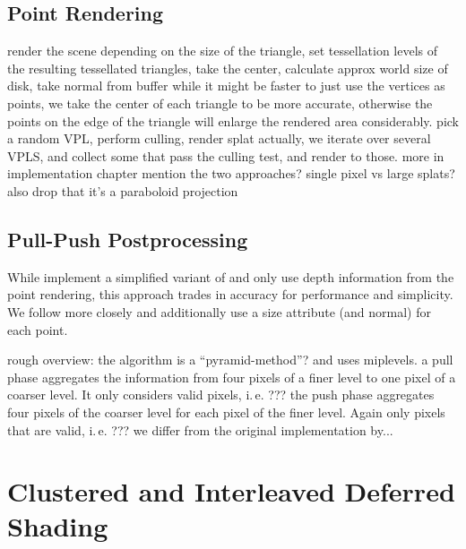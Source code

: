 \subsection{Point Rendering}
\begin{outline}
\1 render the scene
\1 depending on the size of the triangle, set tessellation levels
\1 of the resulting tessellated triangles, take the center, calculate approx world size of disk, take normal from buffer
\1 while it might be faster to just use the vertices as points, we take the center of each triangle to be more accurate, otherwise the points on the edge of the triangle will enlarge the rendered area considerably.
\1 pick a random VPL, perform culling, render splat
\1 actually, we iterate over several VPLS, and collect some that pass the culling test, and render to those. more in implementation chapter
\1 mention the two approaches? single pixel vs large splats?
\1 also drop that it's a paraboloid projection
\end{outline}

\subsection{Pull-Push Postprocessing}

\begin{outline}
\1 While \citep{ritschel2008ism} implement a simplified variant of \citet{Marroquim:2007:reconstruction} and only use depth information from the point rendering, this approach trades in accuracy for performance and simplicity. We follow \citet{Marroquim:2007:reconstruction} more closely and additionally use a size attribute (and normal) for each point.

\1 rough overview: the algorithm is a ``pyramid-method''? and uses miplevels.
\1 a pull phase aggregates the information from four pixels of a finer level to one pixel of a coarser level.
\1 It only considers valid pixels, i.\,e. ???
\1 the push phase aggregates four pixels of the coarser level for each pixel of the finer level.
\1 Again only pixels that are valid, i.\,e. ???
\1 we differ from the original implementation by...
\end{outline}



\section{Clustered and Interleaved Deferred Shading}
\label{sec:clusteredAndInterleavedShading}

